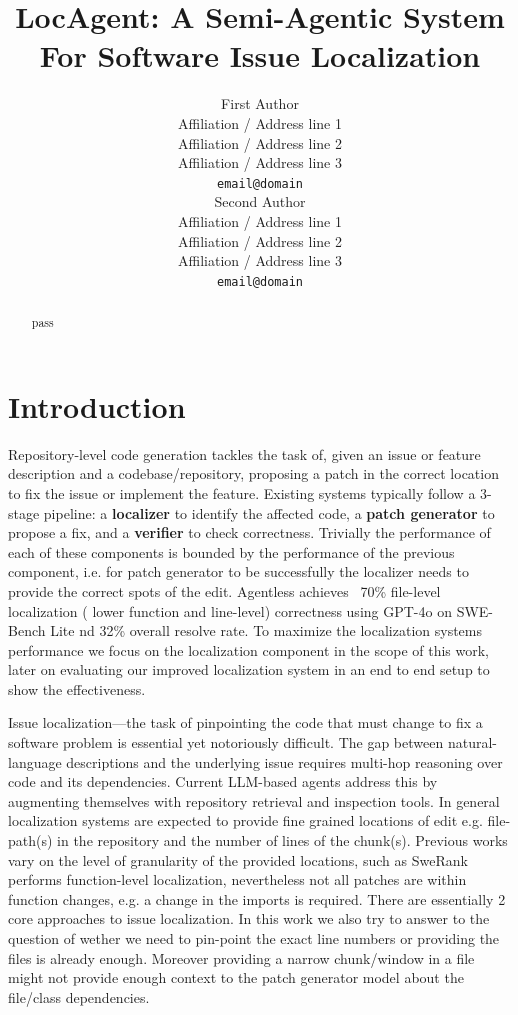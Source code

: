 \documentclass[11pt]{article}
\title{LocAgent: A Semi-Agentic System For Software Issue Localization}
\author{First Author \\
  Affiliation / Address line 1 \\
  Affiliation / Address line 2 \\
  Affiliation / Address line 3 \\
  \texttt{email@domain} \\\And
  Second Author \\
  Affiliation / Address line 1 \\
  Affiliation / Address line 2 \\
  Affiliation / Address line 3 \\
  \texttt{email@domain} \\}
\begin{document}
\maketitle
\begin{abstract}
pass
\end{abstract}


\section{Introduction}
Repository-level code generation tackles the task of, given an issue or feature description and a codebase/repository, proposing a patch in the correct location to fix the issue or implement the feature.
Existing systems \citep{xia2024agentlessdemystifyingllmbasedsoftware, wang2025openhandsopenplatformai, yang2024sweagentagentcomputerinterfacesenable} typically follow a 3-stage pipeline: a \textbf{localizer} to identify the affected code, a \textbf{patch generator} to propose a fix, and a \textbf{verifier} to check correctness.
Trivially the performance of each of these components is bounded by the performance of the previous component, i.e. for patch generator to be successfully the localizer needs to provide the correct spots of the edit.
Agentless \citep{jimenez2024swebenchlanguagemodelsresolve} achieves ~70\% file-level localization ( lower function and line-level) correctness using GPT-4o on SWE-Bench Lite \citep{jimenez2024swebench} nd 32\% overall resolve rate.
To maximize the localization systems performance we focus on the localization component in the scope of this work, later on evaluating our improved localization system in an end to end setup to show the effectiveness.

Issue localization—the task of pinpointing the code that must change to fix a software problem is essential yet notoriously difficult.
The gap between natural-language descriptions and the underlying issue requires multi-hop reasoning over code and its dependencies.
Current LLM-based agents address this by augmenting themselves with repository retrieval and inspection tools.
In general localization systems are expected to provide fine grained locations of edit e.g. file-path(s) in the repository and the number of lines of the chunk(s).
Previous works vary on the level of granularity of the provided locations, such as SweRank \citep{reddy2025sweranksoftwareissuelocalization} performs function-level localization, nevertheless not all patches are within function changes, e.g. a change in the imports is required.
There are essentially 2 core approaches to issue localization.
In this work we also try to answer to the question of wether we need to pin-point the exact line numbers or providing the files is already enough.
Moreover providing a narrow chunk/window in a file might not provide enough context to the patch generator model about the file/class dependencies.
\end{document}
